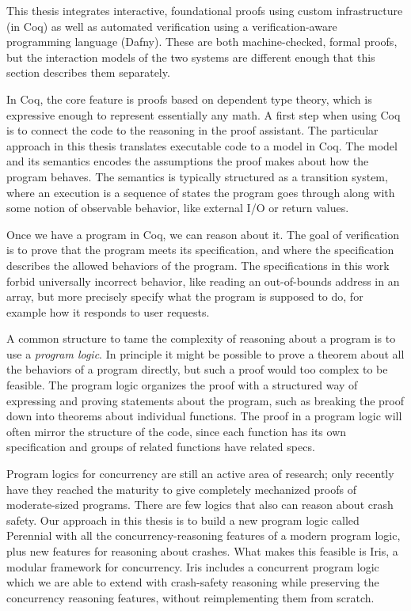 This thesis integrates interactive, foundational proofs using custom
infrastructure (in Coq) as well as automated verification using a
verification-aware programming language (Dafny). These are both machine-checked,
formal proofs, but the interaction models of the two systems are different
enough that this section describes them separately.

In Coq, the core feature is proofs based on dependent type theory, which is
expressive enough to represent essentially any math. A first step when using Coq
is to connect the code to the reasoning in the proof assistant. The particular
approach in this thesis translates executable code to a model in Coq. The model
and its semantics encodes the
assumptions the proof makes about how the program behaves. The semantics is typically structured as a transition
system, where an execution is a sequence of states the program goes through
along with some notion of observable behavior, like external I/O or return
values. 

Once we have a program in Coq, we can reason about it. The goal of
verification is to prove that the program meets its specification, and
where the specification describes the allowed behaviors of the program. The
specifications in this work forbid universally incorrect behavior, like reading an
out-of-bounds address in an array, but more precisely specify what the program
is supposed to do, for example how it responds to user requests.


A common structure to tame the complexity of reasoning about a program is to use
a \emph{program logic}. In principle it might be possible to prove a theorem
about all the behaviors of a program directly, but such a proof would too
complex to be feasible. The program logic organizes the proof with a structured
way of expressing and proving statements about the program, such as breaking the
proof down into theorems about individual functions. The proof in a program
logic will often mirror the structure of the code, since each function has its
own specification and groups of related functions have related specs.

Program logics for concurrency are still an active area of research; only
recently have they reached the maturity to give completely mechanized proofs of
moderate-sized programs. There are few logics that also can reason about crash
safety. Our approach in this thesis is to build a new program logic called Perennial with all the
concurrency-reasoning features of a modern program logic, plus new features for
reasoning about crashes. What makes this feasible is Iris, a modular framework
for concurrency. Iris includes a concurrent program logic which we are able to
extend with crash-safety reasoning while preserving the concurrency reasoning
features, without reimplementing them from scratch.

